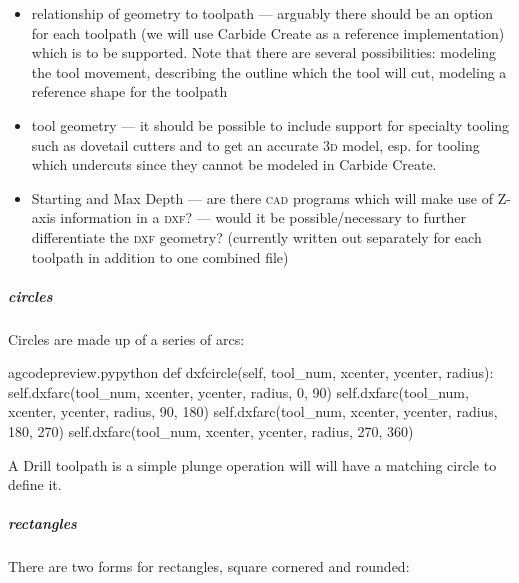 \documentclass{ltxdoc}
\begin{document}
\begin{itemize}
 \item relationship of geometry to toolpath --- arguably there should be an option for each
       toolpath (we will use Carbide Create as a reference implementation) which is to be 
       supported. Note that there are several possibilities: modeling the tool movement, 
       describing the outline which the tool will cut, modeling a reference shape for the toolpath
 \item tool geometry --- it should be possible to include support for specialty tooling 
       such as dovetail cutters and to get an accurate \textsc{3d} model, esp. for tooling which
       undercuts since they cannot be modeled in Carbide Create.
 \item Starting and Max Depth --- are there \textsc{cad} programs which will make use of Z-axis information 
       in a \textsc{dxf}? --- would it be possible/necessary to further differentiate the \textsc{dxf} geometry?
       (currently  written out separately for each toolpath in addition to one combined file)
\end{itemize}

\subparagraph{circles}

Circles are made up of a series of arcs:

\lstset{firstnumber=\thegcpy}
\begin{writecode}{a}{gcodepreview.py}{python}
    def dxfcircle(self, tool_num, xcenter, ycenter, radius):
        self.dxfarc(tool_num, xcenter, ycenter, radius,  0, 90)
        self.dxfarc(tool_num, xcenter, ycenter, radius, 90, 180)
        self.dxfarc(tool_num, xcenter, ycenter, radius, 180, 270)
        self.dxfarc(tool_num, xcenter, ycenter, radius, 270, 360)

\end{writecode}
\addtocounter{gcpy}{6}

A Drill toolpath is a simple plunge operation will will have a matching circle to define it.

\subparagraph{rectangles}

There are two forms for rectangles, square cornered and rounded:
\end{document}
